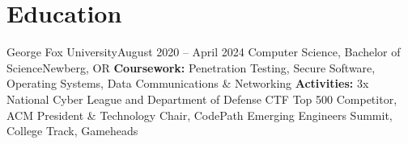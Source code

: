 \section{Education}
  \resumeSubHeadingListStart
    \resumeEducationSubheading
        {George Fox University}{August 2020 -- April 2024}
        {Computer Science, Bachelor of Science}{Newberg, OR}
        {\textbf{Coursework:} Penetration Testing, Secure Software, Operating Systems, Data Communications \& Networking}
        {\textbf{Activities:} 3x National Cyber League and Department of Defense CTF Top 500 Competitor, ACM President \& Technology Chair, CodePath Emerging Engineers Summit, College Track, Gameheads}
  \resumeSubHeadingListEnd


